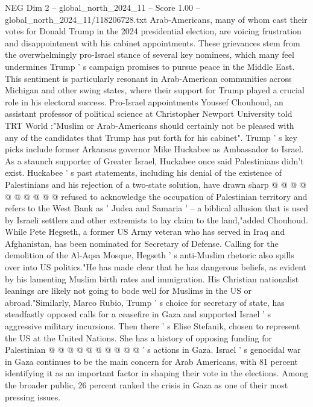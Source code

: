 \begin{textsample}{NEG Dim 2 – global\_north\_2024\_11 – Score 1.00 – global\_north\_2024\_11/118206728.txt}  \label{ex:f2_neg_191}
Arab-Americans, many of whom cast their votes for Donald Trump in the 2024 presidential election, are voicing frustration and disappointment with his cabinet appointments.
These grievances stem from the overwhelmingly pro-Israel stance of several key nominees, which many feel undermines Trump ' s campaign promises to pursue peace in the Middle East.
This sentiment is particularly resonant in Arab-American communities across Michigan and other swing states, where their support for Trump played a crucial role in his electoral success.
Pro-Israel appointments Youssef Chouhoud, an assistant professor of political science at Christopher Newport University told TRT World :"Muslim or Arab-Americans should certainly not be pleased with any of the candidates that Trump has put forth for his cabinet".
Trump ' s key picks include former Arkansas governor Mike Huckabee as Ambassador to Israel.
As a staunch supporter of Greater Israel, Huckabee once said Palestinians didn't exist.
Huckabee ' s past statements, including his denial of the existence of Palestinians and his rejection of a two-state solution, have drawn sharp @ @ @ @ @ @ @ @ @ @ refused to acknowledge the occupation of Palestinian territory and refers to the West Bank as ' Judea and Samaria ' -- a biblical allusion that is used by Israeli settlers and other extremists to lay claim to the land,"added Chouhoud.
While Pete Hegseth, a former US Army veteran who has served in Iraq and Afghanistan, has been nominated for Secretary of Defense.
Calling for the demolition of the Al-Aqsa Mosque, Hegseth ' s anti-Muslim rhetoric also spills over into US politics."He has made clear that he has dangerous beliefs, as evident by his lamenting Muslim birth rates and immigration.
His Christian nationalist leanings are likely not going to bode well for Muslims in the US or abroad."Similarly, Marco Rubio, Trump ' s choice for secretary of state, has steadfastly opposed calls for a ceasefire in Gaza and supported Israel ' s aggressive military incursions.
Then there ' s Elise Stefanik, chosen to represent the US at the United Nations.
She has a history of opposing funding for Palestinian @ @ @ @ @ @ @ @ @ @ ' s actions in Gaza.
Israel ' s genocidal war in Gaza continues to be the main concern for Arab Americans, with 81 percent identifying it as an important factor in shaping their vote in the elections.
Among the broader public, 26 percent ranked the crisis in Gaza as one of their most pressing issues.

\end{textsample}

